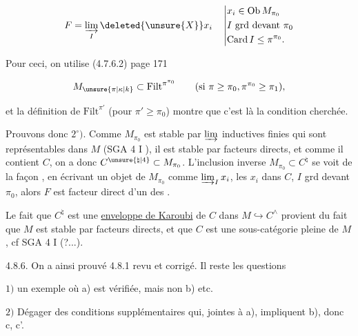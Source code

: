 \[ F=\varinjlim_I \deleted{\unsure{X}}x_i \quad \left|\begin{aligned}
&x_i\in\mathrm{Ob}\,M_{\pi_0}\\
&I\ \text{grd devant }\pi_0\\
&\mathrm{Card}\, I\leq\pi^{\pi_0}.
\end{aligned}\right. \]


Pour ceci, on utilise (4.7.6.2) page 171

\[ M_{\unsure{\pi|\kappa|k}}\subset\mathrm{Filt}^{\pi^{\pi_0}}\qquad(\text{si }\pi\geq\pi_0,\pi^{\pi_0}\geq\pi_1), \]

et la définition de $\mathrm{Filt}^{\pi'}$ (pour $\pi'\geq\pi_0$)  montre que c'est là la condition cherchée.

Prouvons donc $2^\circ)$. Comme $M_{\pi_0}$ est stable par  $\varinjlim$ inductives finies qui sont représentables dans $M$ (SGA 4 I ), il est stable par facteurs directs, et comme il contient $C$, on a donc $C^{\unsure{\natural|4}}\subset M_{\pi_0}$.  L'inclusion inverse $M_{\pi_0}\subset C^{\natural}$ se voit de la façon , en écrivant un objet  de $M_{\pi_0}$ comme $\varinjlim_I x_i$, les $x_i$ dans $C$, $I$ grd devant $\pi_0$, alors $F$  est facteur direct d'un des .

Le fait que $C^{\natural}$ est une \uline{enveloppe de Karoubi} de $C$ dans $M\hookrightarrow C^{\wedge}$ provient du fait que $M$ est stable par facteurs directs, et que $C$ est une sous-catégorie pleine de $M$, cf SGA 4 I (?...).

4.8.6.  On a ainsi prouvé 4.8.1 revu et corrigé. Il reste les questions 

$1)$  un exemple où  a) est  vérifiée, mais non b) etc.


$2)$ Dégager des conditions supplémentaires  qui, jointes à a), impliquent b), donc c, c'.

